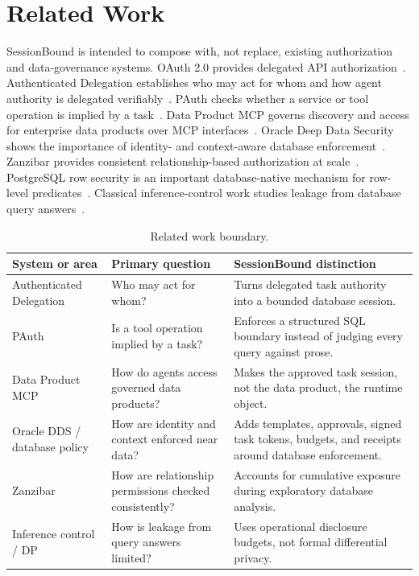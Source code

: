\documentclass[10pt,twocolumn]{article}
\begin{document}
\section{Related Work}

SessionBound is intended to compose with, not replace, existing
authorization and data-governance systems. OAuth 2.0 provides delegated
API authorization~\cite{rfc6749}. Authenticated Delegation establishes
who may act for whom and how agent authority is delegated
verifiably~\cite{south2025authenticateddelegation}. PAuth checks
whether a service or tool operation is implied by a
task~\cite{sharma2026pauth}. Data Product MCP governs discovery and
access for enterprise data products over MCP
interfaces~\cite{tonnarelli2026dataproductmcp,mcp2025specification}.
Oracle Deep Data Security shows the importance of identity- and
context-aware database enforcement~\cite{oracle2026deepdatasecuritydocs,oracle2026deepdatasecuritybrief}.
Zanzibar provides consistent relationship-based authorization at
scale~\cite{pang2019zanzibar}. PostgreSQL row security is an important
database-native mechanism for row-level predicates~\cite{postgresql2026rowsecurity}.
Classical inference-control work studies leakage from database query
answers~\cite{adam1989securitycontrol}.

\begin{table}[t]
\centering
\small
\caption{Related work boundary.}
\label{tab:related}
\begin{tabular}{@{}p{}p{}p{}@{}}
\toprule
System or area & Primary question & SessionBound distinction \\
\midrule
Authenticated Delegation & Who may act for whom? & Turns delegated task authority into a bounded database session. \\
PAuth & Is a tool operation implied by a task? & Enforces a structured SQL boundary instead of judging every query against prose. \\
Data Product MCP & How do agents access governed data products? & Makes the approved task session, not the data product, the runtime object. \\
Oracle DDS / database policy & How are identity and context enforced near data? & Adds templates, approvals, signed task tokens, budgets, and receipts around database enforcement. \\
Zanzibar & How are relationship permissions checked consistently? & Accounts for cumulative exposure during exploratory database analysis. \\
Inference control / DP & How is leakage from query answers limited? & Uses operational disclosure budgets, not formal differential privacy. \\
\bottomrule
\end{tabular}
\end{table}
\end{document}
